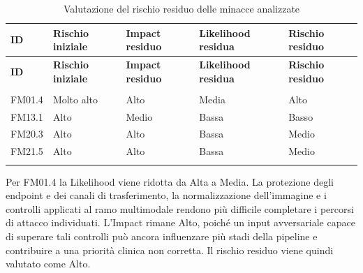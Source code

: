 {
\small
{}
\setlength{\tabcolsep}{4pt}
\renewcommand{\arraystretch}{1.08}

\begin{xltabular}{0.75\textwidth}{
    >{\raggedright\arraybackslash}p{1.5cm}
    >{\raggedright\arraybackslash}p{2.4cm}
    >{\raggedright\arraybackslash}p{2.2cm}
    >{\raggedright\arraybackslash}p{2.5cm}
    >{\raggedright\arraybackslash}X
}

\toprule

\textbf{ID} &
\textbf{Rischio iniziale} &
\textbf{Impact residuo} &
\textbf{Likelihood residua} &
\textbf{Rischio residuo} \\

\midrule

\endfirsthead

\toprule

\textbf{ID} &
\textbf{Rischio iniziale} &
\textbf{Impact residuo} &
\textbf{Likelihood residua} &
\textbf{Rischio residuo} \\

\midrule

\endhead

 \\
\endfoot

\endlastfoot


FM01.4 &
Molto alto &
Alto &
Media &
Alto \\

\midrule

FM13.1 &
Alto &
Medio &
Bassa &
Basso \\

\midrule

FM20.3 &
Alto &
Alto &
Bassa &
Medio \\

\midrule

FM21.5 &
Alto &
Alto &
Bassa &
Medio \\

\bottomrule

\caption{Valutazione del rischio residuo delle minacce analizzate}

\label{tab:rischio-residuo}\\

\end{xltabular}
}

Per FM01.4 la Likelihood viene ridotta da Alta a Media. La protezione degli endpoint e dei canali di trasferimento, la normalizzazione dell'immagine e i controlli applicati al ramo multimodale rendono più difficile completare i percorsi di attacco individuati. L'Impact rimane Alto, poiché un input avversariale capace di superare tali controlli può ancora influenzare più stadi della pipeline e contribuire a una priorità clinica non corretta. Il rischio residuo viene quindi valutato come Alto.

